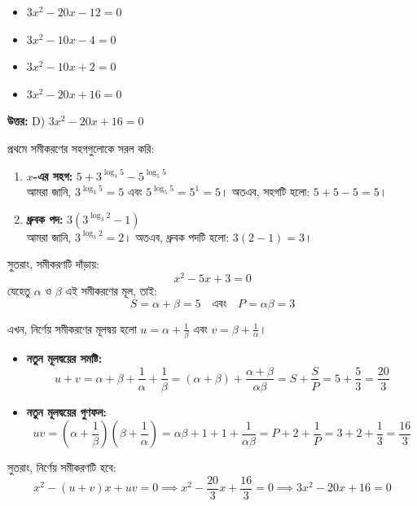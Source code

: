 \documentclass[12pt, a4paper]{article}
\begin{document}
\begin{itemize}[label={}, leftmargin=1cm, itemsep=0.5em]
    \item[\textbf{A)}] $3x^2 - 20x - 12 = 0$
    \item[\textbf{B)}] $3x^2 - 10x - 4 = 0$
    \item[\textbf{C)}] $3x^2 - 10x + 2 = 0$
    \item[\textbf{D)}] $3x^2 - 20x + 16 = 0$
\end{itemize}

\vspace{0.5em}
\begin{tcolorbox}[answerbox]
    \textbf{\color{success} উত্তর:} D) $3x^2 - 20x + 16 = 0$
\end{tcolorbox}
\vspace{1em}

\begin{tcolorbox}[solutionbox={সমাধান (Solution)}]
    \noindent
    প্রথমে সমীকরণের সহগগুলোকে সরল করি:
    \begin{enumerate}[itemsep=0.4em]
        \item \textbf{$x$-এর সহগ:} $5 + 3^{\log_3 5} - 5^{\log_5 5}$ \\
        আমরা জানি, $3^{\log_3 5} = 5$ এবং $5^{\log_5 5} = 5^1 = 5$। 
        অতএব, সহগটি হলো: $5 + 5 - 5 = 5$।
        \item \textbf{ধ্রুবক পদ:} $3(3^{\log_3 2} - 1)$ \\
        আমরা জানি, $3^{\log_3 2} = 2$। 
        অতএব, ধ্রুবক পদটি হলো: $3(2 - 1) = 3$।
    \end{enumerate}
    সুতরাং, সমীকরণটি দাঁড়ায়:
    \[ x^2 - 5x + 3 = 0 \]
    যেহেতু $\alpha$ ও $\beta$ এই সমীকরণের মূল, তাই:
    \[ S = \alpha+\beta = 5 \quad \text{এবং} \quad P = \alpha\beta = 3 \]
    
    \vspace{0.5em}
    এখন, নির্ণেয় সমীকরণের মূলদ্বয় হলো $u = \alpha + \frac{1}{\beta}$ এবং $v = \beta + \frac{1}{\alpha}$।
    \begin{itemize}[itemsep=0.4em]
        \item \textbf{নতুন মূলদ্বয়ের সমষ্টি:} 
        \[ u + v = \alpha + \beta + \frac{1}{\alpha} + \frac{1}{\beta} = (\alpha+\beta) + \frac{\alpha+\beta}{\alpha\beta} = S + \frac{S}{P} = 5 + \frac{5}{3} = \frac{20}{3} \]
        \item \textbf{নতুন মূলদ্বয়ের গুণফল:} 
        \[ uv = \left(\alpha + \frac{1}{\beta}\right)\left(\beta + \frac{1}{\alpha}\right) = \alpha\beta + 1 + 1 + \frac{1}{\alpha\beta} = P + 2 + \frac{1}{P} = 3 + 2 + \frac{1}{3} = \frac{16}{3} \]
    \end{itemize}
    
    \vspace{0.5em}
    সুতরাং, নির্ণেয় সমীকরণটি হবে:
    \[ x^2 - (u+v)x + uv = 0 \implies x^2 - \frac{20}{3}x + \frac{16}{3} = 0 \implies 3x^2 - 20x + 16 = 0 \]
\end{tcolorbox}
\end{document}
